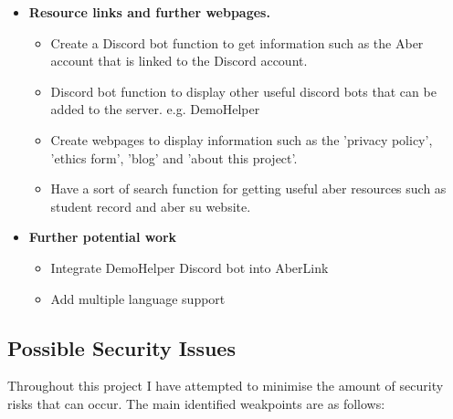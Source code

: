 \begin{itemize}
	\item \textbf{Resource links and further webpages.} 
	\begin{itemize}
		\item Create a Discord bot function to get information such as the Aber account that is linked to the Discord account.
		\item Discord bot function to display other useful discord bots that can be added to the server. e.g. DemoHelper \cite {demohelper}
		\item Create webpages to display information such as the 'privacy policy', 'ethics form', 'blog' and 'about this project'.
		\item Have a sort of search function for getting useful aber resources such as student record and aber su website.
	\end{itemize}
	
	\item \textbf{Further potential work}
	\begin{itemize}
		\item Integrate DemoHelper Discord bot into AberLink
		\item Add multiple language support
	\end{itemize}
\end{itemize}

\subsection{Possible Security Issues}
Throughout this project I have attempted to minimise the amount of security risks that can occur. The main identified weakpoints are as follows:

